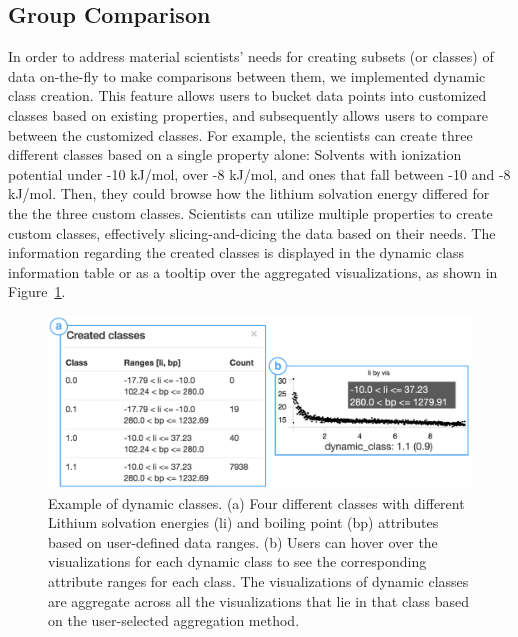 \subsection{Group Comparison}
 In order to address material scientists' needs for creating subsets (or classes) of data on-the-fly to make comparisons between them, we implemented dynamic class creation. This feature allows users to bucket data points into customized classes based on existing properties, and subsequently allows users to compare between the customized classes. For example, the scientists can create three different classes based on a single property alone: Solvents with ionization potential under -10 kJ/mol, over -8 kJ/mol, and ones that fall between -10 and -8 kJ/mol. Then, they could browse how the lithium solvation energy differed for the the three custom classes.
\npar Scientists can utilize multiple properties to create custom classes, effectively slicing-and-dicing the data based on their needs. The information regarding the created classes is displayed in the dynamic class information table or as a tooltip over the aggregated visualizations, as shown in Figure~\ref{dcc}.
\begin{figure}[h!]
\centering
\includegraphics[width=\linewidth]{figures/dcc_example.pdf}
\vspace{-6pt}
\caption{Example of dynamic classes. (a) Four different classes with different Lithium solvation energies (li) and boiling point (bp) attributes based on user-defined data ranges. (b) Users can hover over the visualizations for each dynamic class to see the corresponding attribute ranges for each class. The visualizations of dynamic classes are aggregate across all the visualizations that lie in that class based on the user-selected aggregation method.}
\label{dcc}
\vspace{-10pt}
\end{figure}
